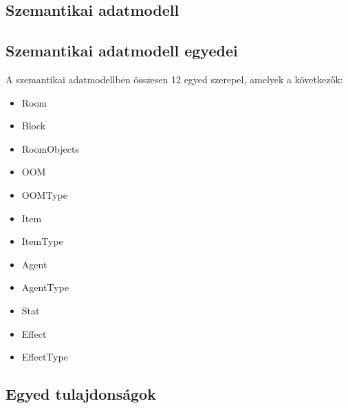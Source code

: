 \subsection{Szemantikai adatmodell}


\subsection{Szemantikai adatmodell egyedei}

A szemantikai adatmodellben összesen 12 egyed szerepel, amelyek a következők:

\begin{itemize}
    \item Room
    \item Block
    \item RoomObjects
    \item OOM
    \item OOMType
    \item Item
    \item ItemType
    \item Agent
    \item AgentType
    \item Stat
    \item Effect
    \item EffectType
\end{itemize}

\subsection{Egyed tulajdonságok}

